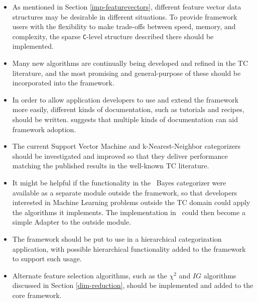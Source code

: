 \begin{itemize}
\item As mentioned in Section \ref{imp-featurevectors}, different
  feature vector data structures may be desirable in different
  situations.  To provide framework users with the flexibility to make
  trade-offs between speed, memory, and complexity, the sparse
  \texttt{C}-level structure described there should be implemented.
\item Many new algorithms are continually being developed and refined
  in the TC literature, and the most promising and general-purpose of
  these should be incorporated into the framework.
\item In order to allow application developers to use and extend the
  framework more easily, different kinds of documentation, such as
  tutorials and recipes, should be written.  \cite{fayad:99} suggests
  that multiple kinds of documentation can aid framework adoption.
\item The current Support Vector Machine and k-Nearest-Neighbor
  categorizers should be investigated and improved so that they
  deliver performance matching the published results in the well-known
  TC literature.
\item It might be helpful if the functionality in the \naive\ Bayes
  categorizer were available as a separate module outside the
  framework, so that developers interested in Machine Learning
  problems outside the TC domain could apply the algorithms it
  implements.  The implementation in \aicat\ could then become a
  simple Adapter to the outside module.
\item The framework should be put to use in a hierarchical
  categorization application, with possible hierarchical functionality
  added to the framework to support such usage.
\item Alternate feature selection algorithms, such as the $\chi^2$ and
  $IG$ algorithms discussed in Section \ref{dim-reduction}, should be
  implemented and added to the core framework.
\end{itemize}
